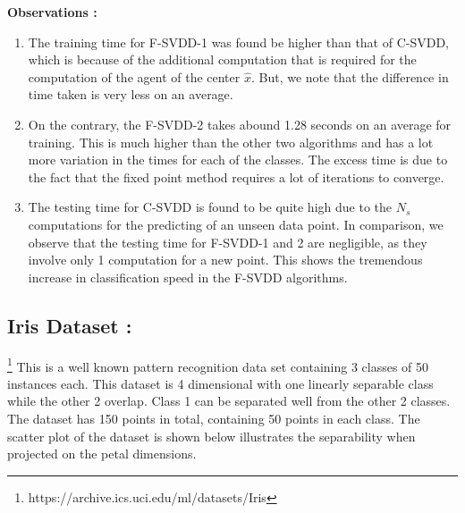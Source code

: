 \documentclass{article} %
\begin{document}
\textbf{Observations :}
\begin{enumerate}
\item The training time for F-SVDD-1 was found be higher than that of C-SVDD, which is because of the additional computation that is required for the computation of the agent of the center $\hat{x}$. But, we note that the difference in time taken is very less on an average.

\item On the contrary, the F-SVDD-2 takes abound 1.28 seconds on an average for training. This is much higher than the other two algorithms and has a lot more variation in the times for each of the classes. The excess time is due to the fact that the fixed point method requires a lot of iterations to converge.

\item The testing time for C-SVDD is found to be quite high due to the $N_s$ computations for the predicting of an unseen data point. In comparison, we observe that the testing time for F-SVDD-1 and 2 are negligible, as they involve only 1 computation for a new point. This shows the tremendous increase in classification speed in the F-SVDD algorithms.
\end{enumerate}


\subsection{Iris Dataset :} \footnote{https://archive.ics.uci.edu/ml/datasets/Iris}
This is a well known pattern recognition data set containing 3 classes of 50 instances each. This dataset is 4 dimensional with one linearly separable class while the other 2 overlap. Class 1 can be separated well from the other 2 classes. The dataset has 150 points in total, containing 50 points in each class.
The scatter plot of the dataset is shown below illustrates the separability when projected on the petal dimensions.
\end{document}
